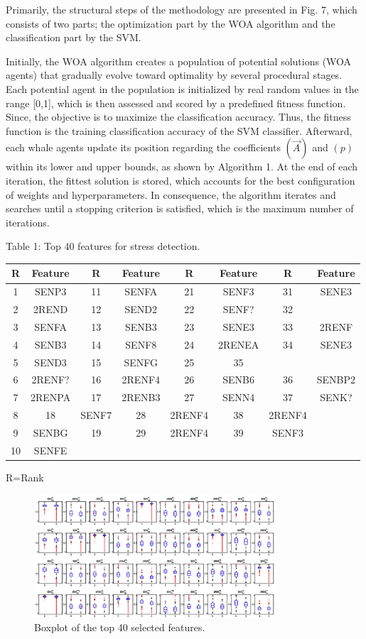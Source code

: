 \documentclass{article}
\begin{document}
Primarily, the structural steps of the methodology are presented in Fig. 7, which consists of two parts; the optimization part by the WOA algorithm and the classification part by the SVM.


Initially, the WOA algorithm creates a population of potential solutions (WOA agents) that gradually evolve toward optimality by several procedural stages. Each potential agent in the population is initialized by real random values in the range [0,1], which is then assessed and scored by a predefined fitness function. Since, the objective is to maximize the classification accuracy. Thus, the fitness function is the training classification accuracy of the SVM classifier. Afterward, each whale agents update its position regarding the coefficients $(\vec{A})$ and $(p)$ within its lower and upper bounds, as shown by Algorithm 1. At the end of each iteration, the fittest solution is stored, which accounts for the best configuration of weights and hyperparameters. In consequence, the algorithm iterates and searches until a stopping criterion is satisfied, which is the maximum number of iterations.


Table 1: Top 40 features for stress detection.


\begin{tabular}{|c|c|c|c|c|c|c|c|}\hline
R & Feature & R & Feature & R & Feature & R & Feature \\ \hline
1 & SENP3 & 11 & SENFA & 21 & SENF3 & 31 & SENE3 \\ \hline
2 & 2REND & 12 & SEND2 & 22 & SENF? & 32 &  \\ \hline
3 & SENFA & 13 & SENB3 & 23 & SENE3 & 33 & 2RENF \\ \hline
4 & SENB3 & 14 & SENF8 & 24 & 2RENEA & 34 & SENE3 \\ \hline
5 & SEND3 & 15 & SENFG & 25 & 35 &  &  \\ \hline
6 & 2RENF? & 16 & 2RENF4 & 26 & SENB6 & 36 & SENBP2 \\ \hline
7 & 2RENPA & 17 & 2RENB3 & 27 & SENN4 & 37 & SENK? \\ \hline
8 & 18 & SENF7 & 28 & 2RENF4 & 38 & 2RENF4 &  \\ \hline
9 & SENBG & 19 & 29 & 2RENF4 & 39 & SENF3 &  \\ \hline
10 & SENFE &  &  &  &  &  &  \\ \hline
\end{tabular}
R=Rank


\begin{figure}[htbp]
\centering
\includegraphics[width=0.8\textwidth]{images/a41c606205bf7eabfb56a60f2b4aef6e7e8c01c8fbc8cfcdeea8bca520e5cf96.jpg}
\caption{Boxplot of the top 40 selected features.}
\end{figure}
\end{document}
